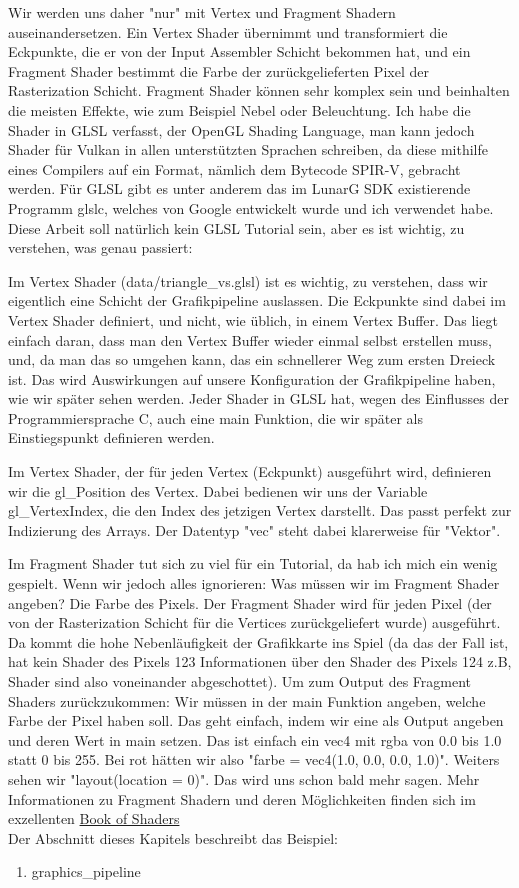 \documentclass[11pt,a4paper]{report}
\begin{document}
Wir werden uns daher "nur" mit Vertex und Fragment Shadern auseinandersetzen. Ein Vertex Shader übernimmt und transformiert die Eckpunkte, die er von der Input Assembler Schicht bekommen hat, und ein Fragment Shader bestimmt die Farbe der zurückgelieferten Pixel der Rasterization Schicht. Fragment Shader können sehr komplex sein und beinhalten die meisten Effekte, wie zum Beispiel Nebel oder Beleuchtung. Ich habe die Shader in GLSL verfasst, der OpenGL Shading Language, man kann jedoch Shader für Vulkan in allen unterstützten Sprachen schreiben, da diese mithilfe eines Compilers auf ein Format, nämlich dem Bytecode SPIR-V, gebracht werden. Für GLSL gibt es unter anderem das im LunarG SDK existierende Programm glslc, welches von Google entwickelt wurde und ich verwendet habe. Diese Arbeit soll natürlich kein GLSL Tutorial sein, aber es ist wichtig, zu verstehen, was genau passiert:

Im Vertex Shader (data/triangle\_vs.glsl) ist es wichtig, zu verstehen, dass wir eigentlich eine Schicht der Grafikpipeline auslassen. Die Eckpunkte sind dabei im Vertex Shader definiert, und nicht, wie üblich, in einem Vertex Buffer. Das liegt einfach daran, dass man den Vertex Buffer wieder einmal selbst erstellen muss, und, da man das so umgehen kann, das ein schnellerer Weg zum ersten Dreieck ist. Das wird Auswirkungen auf unsere Konfiguration der Grafikpipeline haben, wie wir später sehen werden. Jeder Shader in GLSL hat, wegen des Einflusses der Programmiersprache C, auch eine main Funktion, die wir später als Einstiegspunkt definieren werden.

Im Vertex Shader, der für jeden Vertex (Eckpunkt) ausgeführt wird, definieren wir die gl\_Position des Vertex. Dabei bedienen wir uns der Variable gl\_VertexIndex, die den Index des jetzigen Vertex darstellt. Das passt perfekt zur Indizierung des Arrays. Der Datentyp "vec" steht dabei klarerweise für "Vektor".

Im Fragment Shader tut sich zu viel für ein Tutorial, da hab ich mich ein wenig gespielt. Wenn wir jedoch alles ignorieren: Was müssen wir im Fragment Shader angeben? Die Farbe des Pixels. Der Fragment Shader wird für jeden Pixel (der von der Rasterization Schicht für die Vertices zurückgeliefert wurde) ausgeführt. Da kommt die hohe Nebenläufigkeit der Grafikkarte ins Spiel (da das der Fall ist, hat kein Shader des Pixels 123 Informationen über den Shader des Pixels 124 z.B, Shader sind also voneinander abgeschottet). Um zum Output des Fragment Shaders zurückzukommen: Wir müssen in der main Funktion angeben, welche Farbe der Pixel haben soll. Das geht einfach, indem wir eine als Output angeben und deren Wert in main setzen. Das ist einfach ein vec4 mit rgba von 0.0 bis 1.0 statt 0 bis 255. Bei rot hätten wir also "farbe = vec4(1.0, 0.0, 0.0, 1.0)". Weiters sehen wir "layout(location = 0)". Das wird uns schon bald mehr sagen. Mehr Informationen zu Fragment Shadern und deren Möglichkeiten finden sich im exzellenten \href{https://thebookofshaders.com/}{Book of Shaders}\\
Der Abschnitt dieses Kapitels beschreibt das Beispiel:
\begin{enumerate}
	\item{graphics\_pipeline}
\end{enumerate}
\end{document}

